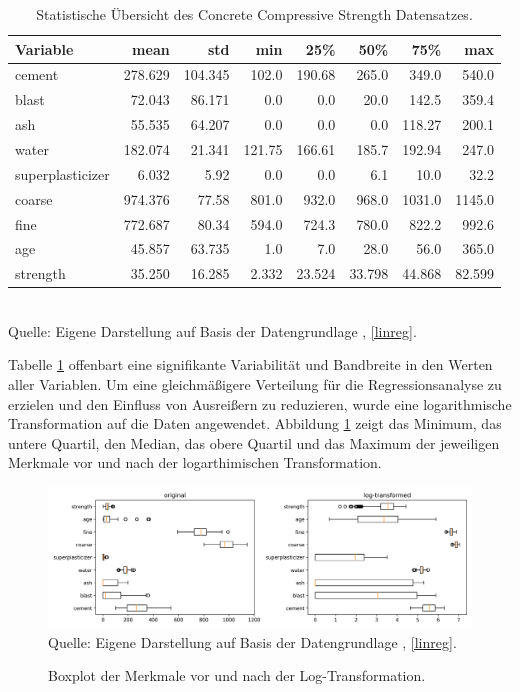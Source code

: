\begin{table}[!h]
    \caption{Statistische Übersicht des Concrete Compressive Strength Datensatzes.}
    \footnotesize
    \begin{tabularx}{\textwidth}{Xrrrrrrr}
    \toprule
    Variable & mean & std & min & 25\% & 50\% & 75\% & max \\
    \midrule
    cement & 278.629 & 104.345 & 102.0 & 190.68 & 265.0 & 349.0 & 540.0 \\
    blast & 72.043 & 86.171 & 0.0 & 0.0 & 20.0 & 142.5 & 359.4 \\
    ash & 55.535 & 64.207 & 0.0 & 0.0 & 0.0 & 118.27 & 200.1 \\
    water & 182.074 & 21.341 & 121.75 & 166.61 & 185.7 & 192.94 & 247.0 \\
    superplasticizer & 6.032 & 5.92 & 0.0 & 0.0 & 6.1 & 10.0 & 32.2 \\
    coarse & 974.376 & 77.58 & 801.0 & 932.0 & 968.0 & 1031.0 & 1145.0 \\
    fine & 772.687 & 80.34 & 594.0 & 724.3 & 780.0 & 822.2 & 992.6 \\
    age & 45.857 & 63.735 & 1.0 & 7.0 & 28.0 & 56.0 & 365.0 \\
    strength & 35.250 & 16.285 & 2.332 & 23.524 & 33.798 & 44.868 & 82.599 \\
    \bottomrule
    \end{tabularx}
    \label{tab:statistics}
    \normalsize
    \\ Quelle: Eigene Darstellung auf Basis der Datengrundlage \cite{misc_concrete_compressive_strength_165}, \ref{linreg}.
\end{table}

Tabelle \ref{tab:statistics} offenbart eine signifikante Variabilität und Bandbreite 
in den Werten aller Variablen. Um eine gleichmäßigere Verteilung für die Regressionsanalyse 
zu erzielen und den Einfluss von Ausreißern zu reduzieren, wurde eine logarithmische Transformation 
auf die Daten angewendet. Abbildung \ref{pic:box} zeigt das Minimum, das untere Quartil, den Median, das obere Quartil und das Maximum
der jeweiligen Merkmale vor und nach der logarthimischen Transformation. 


\begin{figure}[!h]
    \caption{Boxplot der Merkmale vor und nach der Log-Transformation.}
    \includegraphics[width=1\textwidth]{../scripts/images/boxplot.png}
    Quelle: Eigene Darstellung auf Basis der Datengrundlage \cite{misc_concrete_compressive_strength_165}, \ref{linreg}.
    \label{pic:box}
\end{figure}

